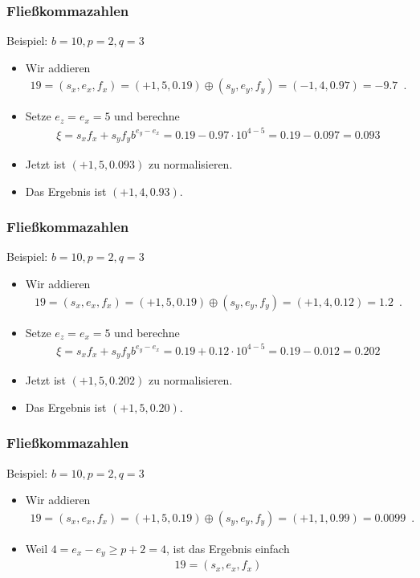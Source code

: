 \documentclass{beamer}
\newcommand{\mytitle}{Flie\ss kommazahlen}
\begin{document}
\begin{frame}\frametitle{\mytitle}
	\begin{block}{Beispiel: $b=10,p=2,q=3$}
	\begin{itemize}
		\item Wir addieren
			\begin{align*}
				19=(s_x,e_x,f_x)=(+1,5,0.19)\oplus(s_y,e_y,f_y)=(-1,4,0.97)=-9.7\enspace.
			\end{align*}
		\item Setze $e_z=e_x=5$ und berechne
			\begin{align*}
				\xi=s_xf_x+s_yf_yb^{e_y-e_x}=0.19-0.97\cdot10^{4-5}=0.19-0.097=0.093
			\end{align*}
		\item Jetzt ist $(+1,5,0.093)$ zu normalisieren.
		\item Das Ergebnis ist $(+1,4,0.93)$.
	\end{itemize}
	\end{block}
\end{frame}

\begin{frame}\frametitle{\mytitle}
	\begin{block}{Beispiel: $b=10,p=2,q=3$}
		\begin{itemize}
			\item Wir addieren
				\begin{align*}
					19=(s_x,e_x,f_x)=(+1,5,0.19)\oplus(s_y,e_y,f_y)=(+1,4,0.12)=1.2\enspace.
				\end{align*}
			\item Setze $e_z=e_x=5$ und berechne
				\begin{align*}
					\xi=s_xf_x+s_yf_yb^{e_y-e_x}=0.19+0.12\cdot10^{4-5}=0.19-0.012=0.202
				\end{align*}
			\item Jetzt ist $(+1,5,0.202)$ zu normalisieren.
			\item Das Ergebnis ist $(+1,5,0.20)$.
		\end{itemize}
	\end{block}
\end{frame}

\begin{frame}\frametitle{\mytitle}
	\begin{block}{Beispiel: $b=10,p=2,q=3$}
		\begin{itemize}
			\item Wir addieren
				\begin{align*}
					19=(s_x,e_x,f_x)=(+1,5,0.19)\oplus(s_y,e_y,f_y)=(+1,1,0.99)=0.0099\enspace.
				\end{align*}
			\item Weil $4=e_x-e_y\geq p+2=4$, ist das Ergebnis einfach 
				\begin{align*}
					19=(s_x,e_x,f_x)
				\end{align*}
		\end{itemize}
	\end{block}
\end{frame}
\end{document}
